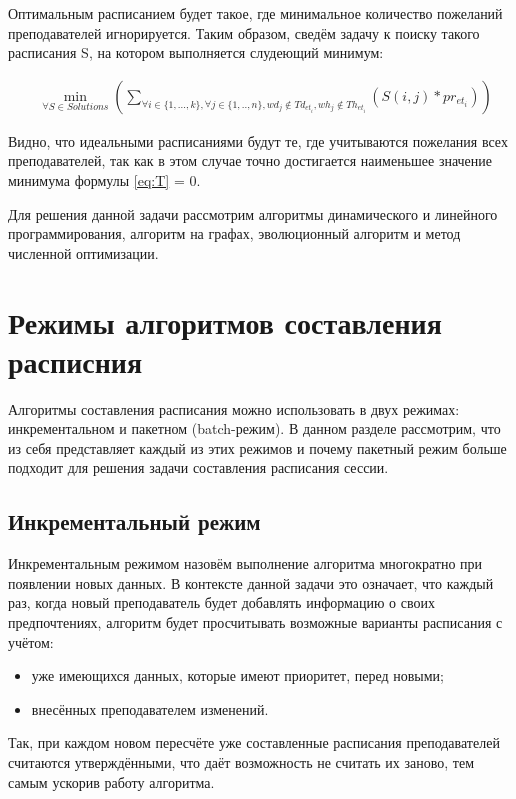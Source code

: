 Оптимальным расписанием будет такое, где минимальное количество пожеланий преподавателей игнорируется. Таким образом, сведём задачу к поиску такого расписания S, на котором выполняется слудеющий минимум:

\begin{align}
	\label{eq:T}
	& \min_{\forall S \in Solutions}(\sum_{\forall i \in \{1,...,k\}, \forall j \in \{1,..,n\}, wd_j \notin Td_{et_i}, wh_j \notin Th_{et_i}}(S(i,j)*pr_{et_i}))
\end{align}

Видно, что идеальными расписаниями будут те, где учитываются пожелания всех преподавателей, так как в этом случае точно достигается наименьшее значение минимума формулы \eqref{eq:T} = 0. 

 Для решения данной задачи рассмотрим алгоритмы динамического и линейного программирования, алгоритм на графах, эволюционный алгоритм и метод численной оптимизации.

\section{Режимы алгоритмов составления расписния} \label{ch2:sec2} 

Алгоритмы составления расписания можно использовать в двух режимах: инкрементальном и пакетном (batch-режим). В данном разделе рассмотрим, что из себя представляет каждый из этих режимов и почему пакетный режим больше подходит для решения задачи составления расписания сессии.

\subsection{Инкрементальный режим}

Инкрементальным режимом назовём выполнение алгоритма многократно при появлении новых данных. В контексте данной задачи это означает, что каждый раз, когда новый преподаватель будет добавлять информацию о своих предпочтениях, алгоритм будет просчитывать возможные варианты расписания с учётом:
\begin{itemize}
	\item уже имеющихся данных, которые имеют приоритет, перед новыми;
	\item внесённых преподавателем изменений.
\end{itemize}

Так, при каждом новом пересчёте уже составленные расписания преподавателей считаются утверждёнными, что даёт возможность не считать их заново, тем самым ускорив работу алгоритма.

